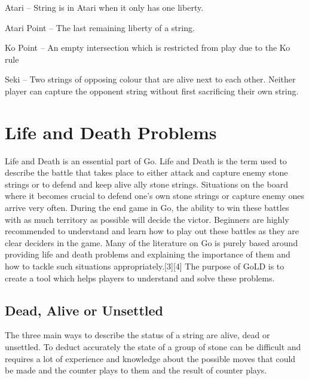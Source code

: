 \documentclass{l4proj}
\begin{document}
Atari – String is in Atari when it only has one liberty.

Atari Point – The last remaining liberty of a string.

Ko Point –  An empty intersection which is restricted from play due to the Ko rule

Seki – Two strings of opposing colour that are alive next to each other. Neither player can capture the opponent string without first sacrificing their own string.





\section{Life and Death Problems}

Life and Death is an essential part of Go. Life and Death is the term used to describe the battle that takes place to either attack and capture enemy stone strings or to defend and keep alive ally stone strings. Situations on the board where it becomes crucial to defend one’s own stone strings or capture enemy ones arrive very often. During the end game in Go, the ability to win these battles with as much territory as possible will decide the victor. Beginners are highly recommended to understand and learn how to play out these battles as they are clear deciders in the game. Many of the literature on Go is purely based around providing life and death problems and explaining the importance of them and how to tackle such situations appropriately.[3][4] The purpose of GoLD is to create a tool which helps players to understand and solve these problems.

\subsection{Dead, Alive or Unsettled}

The three main ways to describe the status of a string are alive, dead or unsettled. To deduct accurately the state of a group of stone can be difficult and requires a lot of experience and knowledge about the possible moves that could be made and the counter plays to them and the result of counter plays.
\end{document}
